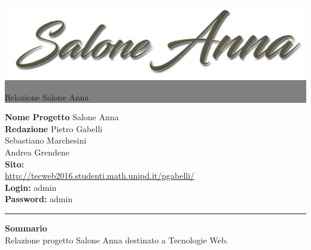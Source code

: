 \documentclass[12pt,a4paper,titlepage]{article}
\newcommand{\HRule}[1]{\hfill \rule{0.2\linewidth}{#1}} %
\begin{document}
	
	\thispagestyle{empty} %
	
	
	\colorbox{grey}{
		\parbox[t]{1.0\linewidth}{
			\centering \fontsize{50pt}{80pt}\selectfont %
			\vspace*{0.7cm} %
			
			\raggedleft
			\includegraphics[width=\textwidth]{../public_html/img/logo.png}
			
			\hfill Relazione Salone Anna \\
			
			\vspace*{0.7cm} %
		}
	}
	
	
	\vfill %
	
	
	{\centering \large 
		\hfill \textbf{Nome Progetto} Salone Anna \\
		\hfill \textbf{Redazione} 	Pietro Gabelli \\
		\hfill 						Sebastiano Marchesini \\
		\hfill						Andrea Grendene \\
		
		\vspace{1cm}
		\textbf{Sito:} \\
		\url{http://tecweb2016.studenti.math.unipd.it/pgabelli/} \\
		\vspace{1cm}
		\textbf{Login:} admin \\
		\textbf{Password:} admin \\
		
		\HRule{1pt}
		
		\textbf{Sommario} \\
		Relazione progetto Salone Anna destinato a Tecnologie Web.
		
	} %
	
\end{document}
